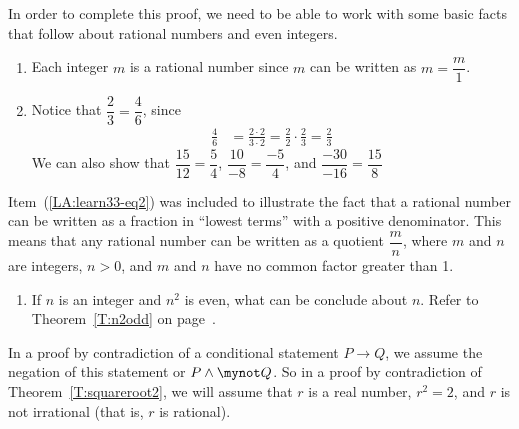 In order to complete this proof, we need to be able to work with some basic facts that follow about rational numbers and even integers.  
\begin{enumerate}

  \item Each integer $m$ is a  rational number since $m$ can be written as $m = \dfrac{m}{1}$.

  \item Notice that $\dfrac{2}{3} = \dfrac{4}{6}$, since
\begin{align*}
\frac{4}{6} &= \frac{2 \cdot 2}{3 \cdot 2} = \frac{2}{2} \cdot \frac{2}{3} = \frac{2}{3}
\end{align*}
We can also show that $\dfrac{15}{12} = \dfrac{5}{4}$, $\dfrac{10}{-8} = \dfrac{-5}{4}$, and $\dfrac{-30}{-16} = \dfrac{15}{8}$ \label{LA:learn33-eq2}%


\end{enumerate}
Item~(\ref{LA:learn33-eq2}) was included to illustrate the fact that a rational number can be written as a fraction in ``lowest terms'' with a positive denominator.  This means that any rational number can be written as a quotient $\dfrac{m}{n}$, where $m$ and $n$ are integers, $ n > 0 $, and $m$ and $n$ have no common factor greater than 1.  %

\setcounter{oldenumi}{\theenumi}
\begin{enumerate} \setcounter{enumi}{\theoldenumi}
  \item If $n$ is an integer and $n^2$ is even, what can be conclude about $n$.  Refer to Theorem~\ref{T:n2odd} on page~\pageref{T:n2odd}.
\end{enumerate}
In a proof by contradiction of a conditional statement $P \to Q$, we assume the negation of this statement or 
$P \wedge \mynot Q$.  So in a proof by contradiction of Theorem~\ref{T:squareroot2}, we will assume that  $r$  is a real number,  $r^2  = 2$, and  $r$  is not irrational (that is, $r$  is rational).  



